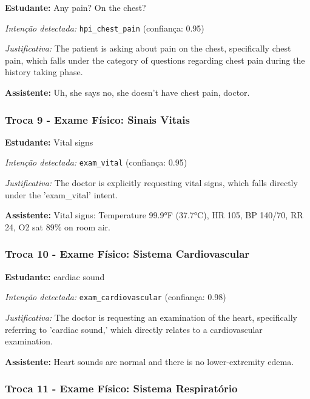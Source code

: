 \textbf{Estudante:} Any pain? On the chest?

\textit{Intenção detectada:} \texttt{hpi\_chest\_pain} (confiança: 0.95)

\textit{Justificativa:} The patient is asking about pain on the chest, specifically chest pain, which falls under the category of questions regarding chest pain during the history taking phase.

\textbf{Assistente:} Uh, she says no, she doesn't have chest pain, doctor.

\vspace{0.5cm}

\subsubsection*{Troca 9 - Exame Físico: Sinais Vitais}

\textbf{Estudante:} Vital signs

\textit{Intenção detectada:} \texttt{exam\_vital} (confiança: 0.95)

\textit{Justificativa:} The doctor is explicitly requesting vital signs, which falls directly under the 'exam\_vital' intent.

\textbf{Assistente:} Vital signs: Temperature 99.9°F (37.7°C), HR 105, BP 140/70, RR 24, O2 sat 89\% on room air.

\vspace{0.5cm}

\subsubsection*{Troca 10 - Exame Físico: Sistema Cardiovascular}

\textbf{Estudante:} cardiac sound

\textit{Intenção detectada:} \texttt{exam\_cardiovascular} (confiança: 0.98)

\textit{Justificativa:} The doctor is requesting an examination of the heart, specifically referring to 'cardiac sound,' which directly relates to a cardiovascular examination.

\textbf{Assistente:} Heart sounds are normal and there is no lower-extremity edema.

\vspace{0.5cm}

\subsubsection*{Troca 11 - Exame Físico: Sistema Respiratório}

